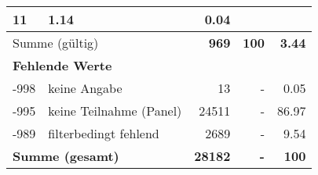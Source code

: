 \begin{longtable}{lXrrr}
       \num{11} &
       \num[round-mode=places,round-precision=2]{1.14} &
         \num[round-mode=places,round-precision=2]{0.04} \\
     \midrule
     \multicolumn{2}{l}{Summe (gültig)} &
       \textbf{\num{969}} &
     \textbf{100} &
       \textbf{\num[round-mode=places,round-precision=2]{3.44}} \\
     \multicolumn{5}{l}{\textbf{Fehlende Werte}}\\
       -998 &
       keine Angabe &
         \num{13} &
        - &
         \num[round-mode=places,round-precision=2]{0.05} \\
       -995 &
       keine Teilnahme (Panel) &
         \num{24511} &
        - &
         \num[round-mode=places,round-precision=2]{86.97} \\
       -989 &
       filterbedingt fehlend &
         \num{2689} &
        - &
         \num[round-mode=places,round-precision=2]{9.54} \\
     \midrule
     \multicolumn{2}{l}{\textbf{Summe (gesamt)}} &
          \textbf{\num{28182}} &
        \textbf{-} &
        \textbf{100} \\
     \bottomrule
     \end{longtable}
     

